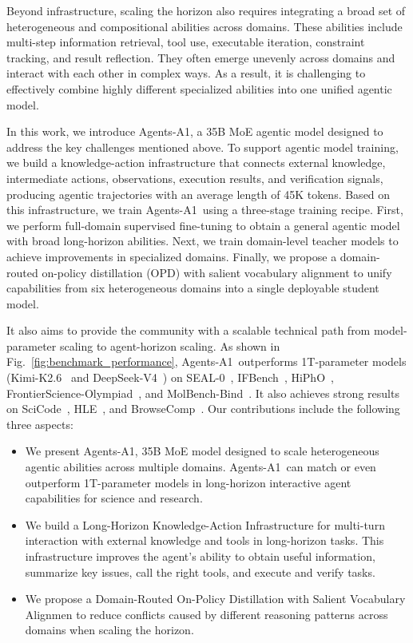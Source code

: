 \documentclass{llmxive}
\providecommand{\ProjectName}{Agents-A1}
\begin{document}
Beyond infrastructure, scaling the horizon also requires integrating a broad set of heterogeneous and compositional abilities across domains. These abilities include multi-step information retrieval, tool use, executable iteration, constraint tracking, and result reflection. They often emerge unevenly across domains and interact with each other in complex ways. As a result, it is challenging to effectively combine highly different specialized abilities into one unified agentic model.

In this work, we introduce \ProjectName, a 35B MoE agentic model designed to address the key challenges mentioned above. To support agentic model training, we build a knowledge-action infrastructure that connects external knowledge, intermediate actions, observations, execution results, and verification signals, producing agentic trajectories with an average length of 45K tokens. Based on this infrastructure, we train \ProjectName~using a three-stage training recipe. First, we perform full-domain supervised fine-tuning to obtain a general agentic model with broad long-horizon abilities. Next, we train domain-level teacher models to achieve improvements in specialized domains. Finally, we propose a domain-routed on-policy distillation (OPD) with salient vocabulary alignment to unify capabilities from six heterogeneous domains into a single deployable student model.

It also aims to provide the community with a scalable technical path from model-parameter scaling to agent-horizon scaling. As shown in Fig.~\ref{fig:benchmark_performance}, \ProjectName~outperforms 1T-parameter models (Kimi-K2.6~\citep{kimi2.6} and DeepSeek-V4~\citep{deepseekai2026deepseekv4}) on SEAL-0~\citep{sealqa}, IFBench~\citep{IFBench}, HiPhO~\citep{hipho}, FrontierScience-Olympiad~\citep{frontierscience}, and MolBench-Bind~\citep{zhang2026molclaw}. It also achieves strong results on SciCode~\citep{scicode}, HLE~\citep{phan2025humanity}, and BrowseComp~\citep{browsecomp}. Our contributions include the following three aspects:
\begin{itemize}
    \item We present \ProjectName, 35B MoE model designed to scale heterogeneous agentic abilities across multiple domains. \ProjectName~can match or even outperform 1T-parameter models in long-horizon interactive agent capabilities for science and research.
    \item We build a Long-Horizon Knowledge-Action Infrastructure for multi-turn interaction with external knowledge and tools in long-horizon tasks. This infrastructure improves the agent’s ability to obtain useful information, summarize key issues, call the right tools, and execute and verify tasks.
    \item We propose a Domain-Routed On-Policy Distillation with Salient Vocabulary Alignmen to reduce conflicts caused by different reasoning patterns across domains when scaling the horizon.
\end{itemize}
\end{document}
